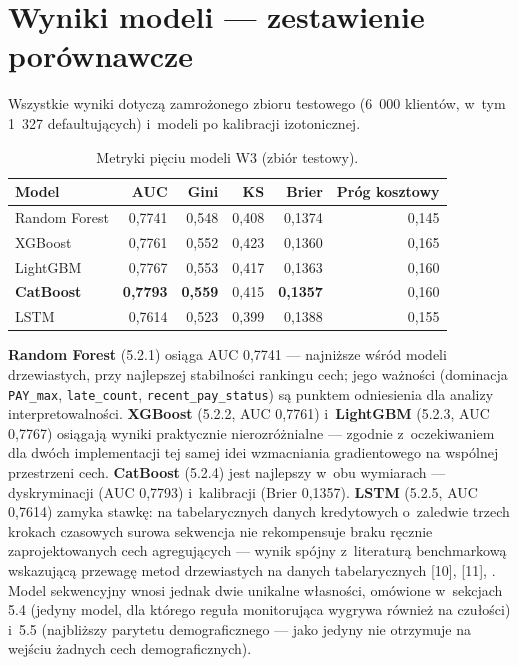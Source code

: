 \section{Wyniki modeli --- zestawienie porównawcze}

Wszystkie wyniki dotyczą zamrożonego zbioru testowego (6~000 klientów, w~tym
1~327 defaultujących) i~modeli po kalibracji izotonicznej.

\begin{table}[htbp]
\centering
\caption{Metryki pięciu modeli W3 (zbiór testowy).}
\label{tab:metryki}
\begin{tabular}{lrrrrr}
\toprule
Model & AUC & Gini & KS & Brier & Próg kosztowy \\
\midrule
Random Forest & 0,7741 & 0,548 & 0,408 & 0,1374 & 0,145 \\
XGBoost       & 0,7761 & 0,552 & 0,423 & 0,1360 & 0,165 \\
LightGBM      & 0,7767 & 0,553 & 0,417 & 0,1363 & 0,160 \\
\textbf{CatBoost} & \textbf{0,7793} & \textbf{0,559} & 0,415 & \textbf{0,1357} & 0,160 \\
LSTM          & 0,7614 & 0,523 & 0,399 & 0,1388 & 0,155 \\
\bottomrule
\end{tabular}
\end{table}

\textbf{Random Forest} (5.2.1) osiąga AUC 0,7741 --- najniższe wśród modeli
drzewiastych, przy najlepszej stabilności rankingu cech; jego ważności
(dominacja \texttt{PAY\_max}, \texttt{late\_count},
\texttt{recent\_pay\_status}) są punktem odniesienia dla analizy
interpretowalności. \textbf{XGBoost} (5.2.2, AUC 0,7761) i~\textbf{LightGBM}
(5.2.3, AUC 0,7767) osiągają wyniki praktycznie nierozróżnialne --- zgodnie
z~oczekiwaniem dla dwóch implementacji tej samej idei wzmacniania gradientowego
na wspólnej przestrzeni cech. \textbf{CatBoost} (5.2.4) jest najlepszy w~obu
wymiarach --- dyskryminacji (AUC 0,7793) i~kalibracji (Brier 0,1357).
\textbf{LSTM} (5.2.5, AUC 0,7614) zamyka stawkę: na tabelarycznych danych
kredytowych o~zaledwie trzech krokach czasowych surowa sekwencja nie
rekompensuje braku ręcznie zaprojektowanych cech agregujących --- wynik spójny
z~literaturą benchmarkową wskazującą przewagę metod drzewiastych na danych
tabelarycznych [10], [11], \cite{grinsztajn2022}. Model sekwencyjny wnosi
jednak dwie unikalne własności, omówione w~sekcjach 5.4 (jedyny model, dla
którego reguła monitorująca wygrywa również na czułości) i~5.5 (najbliższy
parytetu demograficznego --- jako jedyny nie otrzymuje na wejściu żadnych cech
demograficznych).


